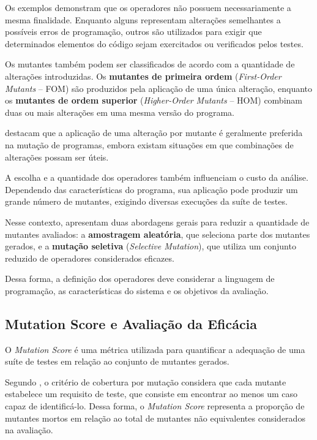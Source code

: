 Os exemplos demonstram que os operadores não possuem necessariamente a mesma finalidade. Enquanto alguns representam alterações semelhantes a possíveis erros de programação, outros são utilizados para exigir que determinados elementos do código sejam exercitados ou verificados pelos testes.

Os mutantes também podem ser classificados de acordo com a quantidade de alterações introduzidas. Os \textbf{mutantes de primeira ordem} (\textit{First-Order Mutants} -- FOM) são produzidos pela aplicação de uma única alteração, enquanto os \textbf{mutantes de ordem superior} (\textit{Higher-Order Mutants} -- HOM) combinam duas ou mais alterações em uma mesma versão do programa.

 destacam que a aplicação de uma alteração por mutante é geralmente preferida na mutação de programas, embora existam situações em que combinações de alterações possam ser úteis.

A escolha e a quantidade dos operadores também influenciam o custo da análise. Dependendo das características do programa, sua aplicação pode produzir um grande número de mutantes, exigindo diversas execuções da suíte de testes.

Nesse contexto,  apresentam duas abordagens gerais para reduzir a quantidade de mutantes avaliados: a \textbf{amostragem aleatória}, que seleciona parte dos mutantes gerados, e a \textbf{mutação seletiva} (\textit{Selective Mutation}), que utiliza um conjunto reduzido de operadores considerados eficazes.

Dessa forma, a definição dos operadores deve considerar a linguagem de programação, as características do sistema e os objetivos da avaliação.

\subsection{Mutation Score e Avaliação da Eficácia}

O \textit{Mutation Score} é uma métrica utilizada para quantificar a adequação de uma suíte de testes em relação ao conjunto de mutantes gerados.

Segundo , o critério de cobertura por mutação considera que cada mutante estabelece um requisito de teste, que consiste em encontrar ao menos um caso capaz de identificá-lo. Dessa forma, o \textit{Mutation Score} representa a proporção de mutantes mortos em relação ao total de mutantes não equivalentes considerados na avaliação.

